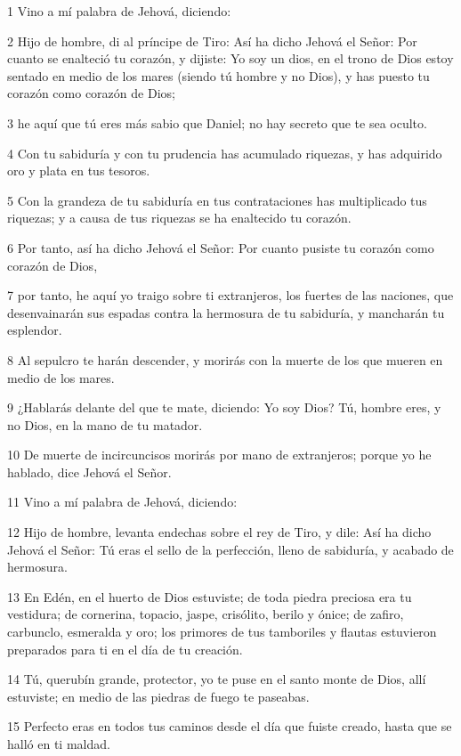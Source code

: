 \par 1 Vino a mí palabra de Jehová, diciendo:
\par 2 Hijo de hombre, di al príncipe de Tiro: Así ha dicho Jehová el Señor: Por cuanto se enalteció tu corazón, y dijiste: Yo soy un dios, en el trono de Dios estoy sentado en medio de los mares (siendo tú hombre y no Dios), y has puesto tu corazón como corazón de Dios;
\par 3 he aquí que tú eres más sabio que Daniel; no hay secreto que te sea oculto.
\par 4 Con tu sabiduría y con tu prudencia has acumulado riquezas, y has adquirido oro y plata en tus tesoros.
\par 5 Con la grandeza de tu sabiduría en tus contrataciones has multiplicado tus riquezas; y a causa de tus riquezas se ha enaltecido tu corazón.
\par 6 Por tanto, así ha dicho Jehová el Señor: Por cuanto pusiste tu corazón como corazón de Dios,
\par 7 por tanto, he aquí yo traigo sobre ti extranjeros, los fuertes de las naciones, que desenvainarán sus espadas contra la hermosura de tu sabiduría, y mancharán tu esplendor.
\par 8 Al sepulcro te harán descender, y morirás con la muerte de los que mueren en medio de los mares.
\par 9 ¿Hablarás delante del que te mate, diciendo: Yo soy Dios? Tú, hombre eres, y no Dios, en la mano de tu matador.
\par 10 De muerte de incircuncisos morirás por mano de extranjeros; porque yo he hablado, dice Jehová el Señor.
\par 11 Vino a mí palabra de Jehová, diciendo:
\par 12 Hijo de hombre, levanta endechas sobre el rey de Tiro, y dile: Así ha dicho Jehová el Señor: Tú eras el sello de la perfección, lleno de sabiduría, y acabado de hermosura.
\par 13 En Edén, en el huerto de Dios estuviste; de toda piedra preciosa era tu vestidura; de cornerina, topacio, jaspe, crisólito, berilo y ónice; de zafiro, carbunclo, esmeralda y oro; los primores de tus tamboriles y flautas estuvieron preparados para ti en el día de tu creación.
\par 14 Tú, querubín grande, protector, yo te puse en el santo monte de Dios, allí estuviste; en medio de las piedras de fuego te paseabas.
\par 15 Perfecto eras en todos tus caminos desde el día que fuiste creado, hasta que se halló en ti maldad.
